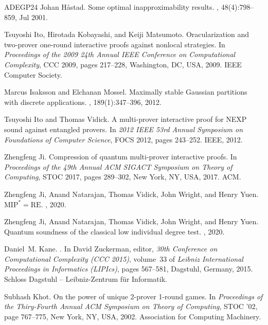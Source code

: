\documentclass[10pt,a4paper]{article}
\theoremstyle{plain}
\theoremstyle{definition}
\newcommand{\1}{\mathbb{1}} %
\begin{document}
\begin{thebibliography}{ADEGP24}
Johan H\r{a}stad.
\newblock Some optimal inapproximability results.
, 48(4):798–859, Jul 2001.

Tsuyoshi Ito, Hirotada Kobayashi, and Keiji Matsumoto.
\newblock Oracularization and two-prover one-round interactive proofs against
  nonlocal strategies.
\newblock In {\em Proceedings of the 2009 24th Annual IEEE Conference on
  Computational Complexity}, CCC 2009, pages 217--228, Washington, DC, USA,
  2009. IEEE Computer Society.

Marcus Isaksson and Elchanan Mossel.
\newblock Maximally stable {G}aussian partitions with discrete applications.
, 189(1):347--396, 2012.

Tsuyoshi Ito and Thomas Vidick.
\newblock A multi-prover interactive proof for {NEXP} sound against entangled
  provers.
\newblock In {\em 2012 IEEE 53rd Annual Symposium on Foundations of Computer
  Science}, FOCS 2012, pages 243--252. IEEE, 2012.

Zhengfeng Ji.
\newblock Compression of quantum multi-prover interactive proofs.
\newblock In {\em Proceedings of the 49th Annual ACM SIGACT Symposium on Theory
  of Computing}, STOC 2017, pages 289--302, New York, NY, USA, 2017. ACM.

Zhengfeng Ji, Anand Natarajan, Thomas Vidick, John Wright, and Henry Yuen.
\newblock $\mathrm{MIP}^*=\mathrm{RE}$.
, 2020.

Zhengfeng Ji, Anand Natarajan, Thomas Vidick, John Wright, and Henry Yuen.
\newblock Quantum soundness of the classical low individual degree test.
, 2020.

Daniel~M. Kane.
.
\newblock In David Zuckerman, editor, {\em 30th Conference on Computational
  Complexity (CCC 2015)}, volume~33 of {\em Leibniz International Proceedings
  in Informatics (LIPIcs)}, pages 567--581, Dagstuhl, Germany, 2015. Schloss
  Dagstuhl -- Leibniz-Zentrum f{\"u}r Informatik.

Subhash Khot.
\newblock On the power of unique 2-prover 1-round games.
\newblock In {\em Proceedings of the Thiry-Fourth Annual ACM Symposium on
  Theory of Computing}, STOC '02, page 767–775, New York, NY, USA, 2002.
  Association for Computing Machinery.


\end{thebibliography}
\end{document}
